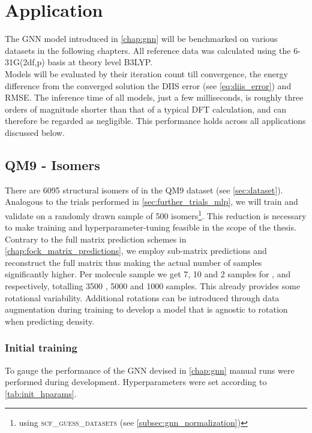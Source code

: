 \chapter{Application}
\label{chap:application}
The GNN model introduced in \autoref{chap:gnn} will be benchmarked on various datasets in the following chapters. All reference data was calculated using the 6-31G(2df,p) basis at theory level B3LYP. \\

Models will be evaluated by their iteration count till convergence, the energy difference from the converged solution the DIIS error (see \autoref{eq:diis_error}) and RMSE. The inference time of all models, just a few milliseconds, is roughly three orders of magnitude shorter than that of a typical DFT calculation, and can therefore be regarded as negligible. This performance holds across all applications discussed below.

\section{QM9 -  Isomers}
\label{sec:qm9_isomers_benchmark}
There are 6095 structural isomers of  in the QM9 dataset (see \autoref{sec:dataset}). Analogous to the trials performed in \autoref{sec:further_trials_mlp}, we will train and validate on a randomly drawn sample of 500 isomers\footnote{using \textsc{scf\_guess\_datasets} (see \autoref{subsec:gnn_normalization})}. This reduction is necessary to make training and hyperparameter-tuning feasible in the scope of the thesis. Contrary to the full matrix prediction schemes in \autoref{chap:fock_matrix_predictions}, we employ sub-matrix predictions and reconstruct the full matrix thus making the actual number of samples significantly higher. Per molecule sample we get 7, 10 and 2 samples for ,  and  respectively, totalling 3500 , 5000  and 1000  samples. This already provides some rotational variability. Additional rotations can be introduced through data augmentation during training to develop a model that is agnostic to rotation when predicting density.\\

\subsection{Initial training}
\label{subsec:qm9_isomers_initial}
To gauge the performance of the GNN devised in \autoref{chap:gnn} manual runs were performed during development. Hyperparameters were set according to \autoref{tab:init_hparams}. 

